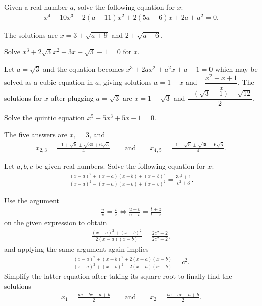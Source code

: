 \documentclass[12pt,a4paper]{memoir}
\theoremstyle{definition}
\begin{document}
\begin{question}
	Given a real number $a$, solve the following equation for $x$:
	\begin{align*}
		x^4-10x^3-2(a-11)x^2+2(5a+6)x+2a+a^2=0.
	\end{align*}
\end{question}

\begin{solution}
	The solutions are $x=3\pm\sqrt{a+9}$ and $2\pm\sqrt{a+6}$.
\end{solution}

\begin{question}
	Solve $x^3+2\sqrt 3 x^2 + 3x + \sqrt 3 - 1 = 0$ for $x$.
\end{question}

\begin{solution}
	Let $a=\sqrt 3$ and the equation becomes $x^3+2ax^2+a^2x+a-1=0$ which may be solved as a cubic equation in $a$, giving solutions $a=1-x$ and $-\dfrac{x^2+x+1}{x}$. The solutions for $x$ after plugging $a=\sqrt 3$ are $x=1-\sqrt 3$ and $\dfrac{-(\sqrt 3 + 1) \pm \sqrt{12}}{2}$.
\end{solution}

\begin{question}
	Solve the quintic equation $x^5-5x^3+5x-1=0$.
\end{question}

\begin{solution}
	The five answers are $x_1=3$, and
	\begin{align*}
		x_{2,3}=\frac{-1+\sqrt5 \pm \sqrt{30+6\sqrt{5}}}{4} \qquad \text{and} \qquad x_{4,5} = \frac{-1-\sqrt5 \pm \sqrt{30-6\sqrt{5}}}{4}.
	\end{align*}
\end{solution}

\begin{question}
	Let $a,b,c$ be given real numbers. Solve the following equation for $x$:
	\begin{align*}
		\frac{(x-a)^2+(x-a)(x-b)+(x-b)^2}{(x-a)^2-(x-a)(x-b)+(x-b)^2} = \frac{3c^2+1}{c^2+3}.
	\end{align*}
\end{question}

\begin{solution}
	Use the argument
	\begin{align*}
		\frac{u}{v} = \frac{t}{z} \iff \frac{u+v}{u-v} = \frac{t+z}{t-z}
	\end{align*}
	on the given expression to obtain
	\begin{align*}
		\frac{(x-a)^2+(x-b)^2}{2(x-a)(x-b)} = \frac{2c^2+2}{2c^2-2},
	\end{align*}
	and applying the same argument again implies
	\begin{align*}
		\frac{(x-a)^2+(x-b)^2+2(x-a)(x-b)}{(x-a)^2+(x-b)^2-2(x-a)(x-b)} = c^2.
	\end{align*}
	Simplify the latter equation after taking its square root to finally find the solutions
	\begin{align*}
		x_1 = \frac{ac-bc+a+b}{2} \qquad \text{and} \qquad x_2 = \frac{bc-ac+a+b}{2}.
	\end{align*}
\end{solution}
\end{document}
